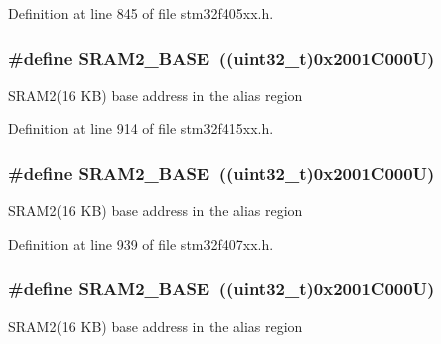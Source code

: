 Definition at line 845 of file stm32f405xx.\+h.

\subsubsection[{\texorpdfstring{S\+R\+A\+M2\+\_\+\+B\+A\+SE}{SRAM2_BASE}}]{\setlength{\rightskip}{0pt plus 5cm}\#define S\+R\+A\+M2\+\_\+\+B\+A\+SE~((uint32\+\_\+t)0x2001\+C000\+U)}\hypertarget{group___peripheral__registers__structures_gadbb42a3d0a8a90a79d2146e4014241b1}{}\label{group___peripheral__registers__structures_gadbb42a3d0a8a90a79d2146e4014241b1}
S\+R\+A\+M2(16 K\+B) base address in the alias region 

Definition at line 914 of file stm32f415xx.\+h.

\subsubsection[{\texorpdfstring{S\+R\+A\+M2\+\_\+\+B\+A\+SE}{SRAM2_BASE}}]{\setlength{\rightskip}{0pt plus 5cm}\#define S\+R\+A\+M2\+\_\+\+B\+A\+SE~((uint32\+\_\+t)0x2001\+C000\+U)}\hypertarget{group___peripheral__registers__structures_gadbb42a3d0a8a90a79d2146e4014241b1}{}\label{group___peripheral__registers__structures_gadbb42a3d0a8a90a79d2146e4014241b1}
S\+R\+A\+M2(16 K\+B) base address in the alias region 

Definition at line 939 of file stm32f407xx.\+h.

\subsubsection[{\texorpdfstring{S\+R\+A\+M2\+\_\+\+B\+A\+SE}{SRAM2_BASE}}]{\setlength{\rightskip}{0pt plus 5cm}\#define S\+R\+A\+M2\+\_\+\+B\+A\+SE~((uint32\+\_\+t)0x2001\+C000\+U)}\hypertarget{group___peripheral__registers__structures_gadbb42a3d0a8a90a79d2146e4014241b1}{}\label{group___peripheral__registers__structures_gadbb42a3d0a8a90a79d2146e4014241b1}
S\+R\+A\+M2(16 K\+B) base address in the alias region 

